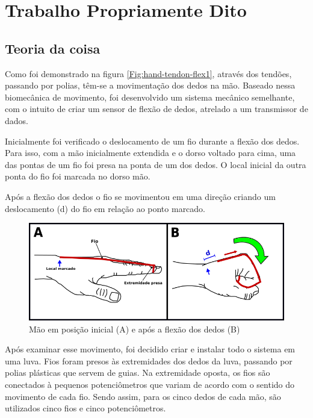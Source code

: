 \documentclass[
	12pt,				%
	openright,			%
	oneside,			%
	a4paper,			%
	english,			%
	brazil				%
	]{abntex2}
\begin{document}
	\chapter{Trabalho Propriamente Dito}

		\section{Teoria da coisa}
			Como foi demonstrado na figura \ref{Fig:hand-tendon-flex1}, através dos tendões, passando por polias, têm-se a movimentação dos dedos na mão. Baseado nessa biomecânica de movimento, foi desenvolvido um sistema mecânico semelhante, com o intuito de criar um sensor de flexão de dedos, atrelado a um transmissor de dados.
			
			Inicialmente foi verificado o deslocamento de um fio durante a flexão dos dedos. Para isso, com a mão inicialmente extendida e o dorso voltado para cima, uma das pontas de um fio foi presa na ponta de um dos dedos. O local inicial da outra ponta do fio foi marcada no dorso mão.

			Após a flexão dos dedos o fio se movimentou em uma direção criando um deslocamento (d) do fio em relação ao ponto marcado.


		\begin{figure}[h!]
			\centering
  		\includegraphics[scale=0.7]{./figures/hand-wire-flex1.png}
			\caption{Mão em posição inicial (A) e após a flexão dos dedos (B)}
  		\label{Fig:hand-wire-flex1}
		\end{figure}


			Após examinar esse movimento, foi decidido criar e instalar todo o sistema em uma luva. Fios foram presos às extremidades dos dedos da luva, passando por polias plásticas que servem de guias. Na extremidade oposta, os fios são conectados à pequenos potenciômetros que variam de acordo com o sentido do movimento de cada fio. Sendo assim, para os cinco dedos de cada mão, são utilizados cinco fios e cinco potenciômetros.
\end{document}
